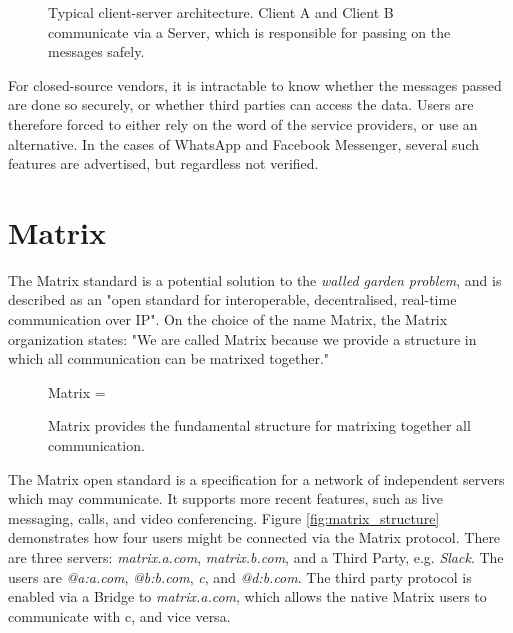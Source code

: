 \begin{figure}
    \centering
    \resizebox{0.7\linewidth}{!}{}
    \caption{
        Typical client-server architecture.
        Client A and Client B communicate via a Server, which is responsible for passing on the messages safely.
    }
    \label{fig:client_server}
\end{figure}

For closed-source vendors, it is intractable to know whether the messages passed are done so securely, or whether third parties can access the data.
Users are therefore forced to either rely on the word of the service providers, or use an alternative.
In the cases of WhatsApp and Facebook Messenger, several such features are advertised, but regardless not verified\cite{twitter_comms_protocol_comparison}.

\section{Matrix}
The Matrix standard is a potential solution to the \textit{walled garden problem}, and is described as an "open standard for interoperable, decentralised, real-time communication over IP"\cite{matrix_org}.
On the choice of the name Matrix, the Matrix organization states: "We are called Matrix because we provide a structure in which all communication can be matrixed together."\cite{matrix_org_faq}

\begin{figure}[]
    \centering
    Matrix = 
    \caption{Matrix provides the fundamental structure for matrixing together all communication.}
    \label{fig:matrixing_together}
\end{figure}

The Matrix open standard\cite{matrix_org_spec} is a specification for a network of independent servers which may communicate.
It supports more recent features, such as live messaging, calls, and video conferencing.
Figure \ref{fig:matrix_structure} demonstrates how four users might be connected via the Matrix protocol.
There are three servers: \textit{matrix.a.com}, \textit{matrix.b.com}, and a Third Party, e.g. \textit{Slack}.
The users are \textit{@a:a.com}, \textit{@b:b.com}, \textit{c}, and \textit{@d:b.com}.
The third party protocol is enabled via a Bridge to \textit{matrix.a.com}, which allows the native Matrix users to communicate with c, and vice versa.

